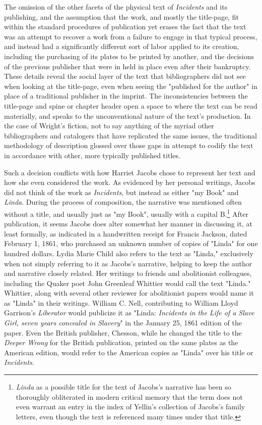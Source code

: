 The omission of the other facets of the physical text of \textit{Incidents} and its publishing, and the assumption that the work, and mostly the title-page, fit within the standard procedures of publication yet erases the fact that the text was an attempt to recover a work from a failure to engage in that typical process, and instead had a significantly different sort of labor applied to its creation, including the purchasing of its plates to be printed by another, and the decisions of the previous publisher that were in held in place even after their bankruptcy. These details reveal the social layer of the text that bibliographers did not see when looking at the title-page, even when seeing the "published for the author" in place of a traditional publisher in the imprint. The inconsistencies between the title-page and spine or chapter header open a space to where the text can be read materially, and speaks to the unconventional nature of the text's production. In the case of Wright's fiction, not to say anything of the myriad other bibliographers and catalogers that have replicated the same issues, the traditional methodology of description glossed over those gaps in attempt to codify the text in accordance with other, more typically published titles. 

Such a decision conflicts with how Harriet Jacobs chose to represent her text and how she even considered the work. As evidenced by her personal writings, Jacobs did not think of the work as \textit{Incidents}, but instead as either "my Book" and \textit{Linda}. During the process of composition, the narrative was mentioned often without a title, and usually just as "my Book", usually with a capital B.\footnote{\textit{Linda} as a possible title for the text of Jacobs's narrative has been so thoroughly obliterated in modern critical memory that the term does not even warrant an entry in the index of Yellin's collection of Jacobs's family letters, even though the text is referenced many times under that title.} After publication, it seems Jacobs does alter somewhat her manner in discussing it, at least formally, as indicated in a handwritten receipt for Francis Jackson, dated February 1, 1861, who purchased an unknown number of copies of "Linda" for one hundred dollars.\autocite[295]{jacobs_harriet_2008-1} Lydia Marie Child also refers to the text as "Linda," exclusively when not simply referring to it as Jacobs's narrative, helping to keep the author and narrative closely related. Her writings to friends and abolitionist colleagues, including the Quaker poet John Greenleaf Whittier would call the text "Linda."\autocite[335, 341-3]{jacobs_harriet_2008-1} Whittier, along with several other reviewer for abolitionist papers would name it as "Linda" in their writings. William C. Nell, contributing to William Lloyd Garrison's \textit{Liberator} would publicize it as "Linda: \textit{Incidents in the Life of a Slave Girl, seven years concealed in Slavery}" in the January 25, 1861 edition of the paper. Even the British publisher, Chesson, while he changed the title to the \textit{Deeper Wrong} for the British publication, printed on the same plates as the American edition, would refer to the American copies as "Linda" over his title or \textit{Incidents}.\autocite[719]{jacobs_harriet_2008-1}

